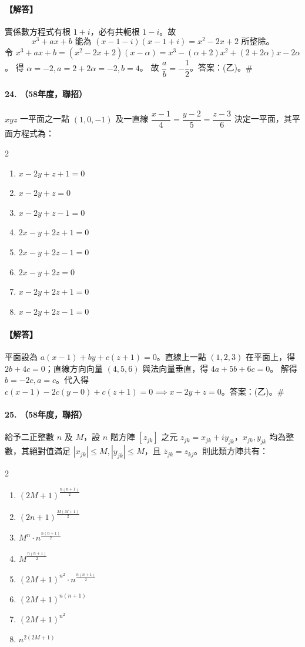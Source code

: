 \paragraph{【解答】}
實係數方程式有根 $1+i$，必有共軛根 $1-i$。故
\[ x^3+ax+b \text{ 能為 } (x-1-i)(x-1+i) = x^2-2x+2 \text{ 所整除。} \]
令 $x^3+ax+b = (x^2-2x+2)(x-\alpha) = x^3 - (\alpha+2)x^2 + (2+2\alpha)x - 2\alpha$。
得 $\alpha = -2, a = 2+2\alpha = -2, b = 4$。
故 $\dfrac{a}{b} = -\dfrac{1}{2}$。答案：(乙)。\hfill$\#$

\paragraph{24. （58年度，聯招）}
$xyz$ 一平面之一點 $(1, 0, -1)$ 及一直線 $\dfrac{x-1}{4} = \dfrac{y-2}{5} = \dfrac{z-3}{6}$ 決定一平面，其平面方程式為：
\begin{multicols}{2}
\begin{enumerate}[label=\tiangan*]
  \item $x-2y+z+1=0$
  \item $x-2y+z=0$
  \item $x-2y+z-1=0$
  \item $2x-y+2z+1=0$
  \item $2x-y+2z-1=0$
  \item $2x-y+2z=0$
  \item $x-2y+2z+1=0$
  \item $x-2y+2z-1=0$
\end{enumerate}
\end{multicols}

\paragraph{【解答】}
平面設為 $a(x-1)+by+c(z+1)=0$。直線上一點 $(1, 2, 3)$ 在平面上，得 $2b+4c=0$；直線方向向量 $(4,5,6)$ 與法向量垂直，得 $4a+5b+6c=0$。
解得 $b=-2c, a=c$。代入得 $c(x-1)-2c(y-0)+c(z+1)=0 \implies x-2y+z=0$。答案：(乙)。\hfill$\#$

\paragraph{25. （58年度，聯招）}
給予二正整數 $n$ 及 $M$，設 $n$ 階方陣 $[z_{jk}]$ 之元 $z_{jk} = x_{jk} + i y_{jk}$，$x_{jk}, y_{jk}$ 均為整數，其絕對值滿足 $|x_{jk}| \le M, |y_{jk}| \le M$，且 $\bar{z}_{jk} = z_{kj}$。則此類方陣共有：
\begin{multicols}{2}
\begin{enumerate}[label=\tiangan*]
  \item $(2M+1)^{\frac{n(n+1)}{2}}$
  \item $(2n+1)^{\frac{M(M+1)}{2}}$
  \item $M^n \cdot n^{\frac{n(n+1)}{2}}$
  \item $M^{\frac{n(n+1)}{2}}$
  \item $(2M+1)^{n^2} \cdot n^{\frac{n(n+1)}{2}}$
  \item $(2M+1)^{n(n+1)}$
  \item $(2M+1)^{n^2}$
  \item $n^{2(2M+1)}$
\end{enumerate}
\end{multicols}

